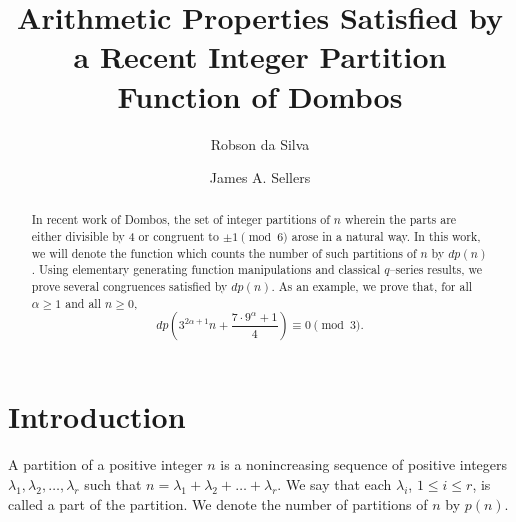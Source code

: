 \documentclass{amsart}
\begin{document}
	
	
	\title[A Partition Function of Dombos]{Arithmetic Properties Satisfied by a Recent Integer Partition Function of Dombos}
	
	
	\author{Robson da Silva}
	\address{Universidade Federal de S\~ao Paulo, S\~ao Jos\'e dos Campos, SP 12247--014, Brazil}

	\author{James A. Sellers}
	\address{Department of Mathematics and Statistics, University of Minnesota Duluth, Duluth, MN 55812, USA}

	
	
	
	

\begin{abstract}
In recent work of Dombos, the set of integer partitions of $n$ wherein the parts are either divisible by 4 or congruent to $\pm 1 \pmod{6}$ arose in a natural way.   In this work, we will denote the function which counts the number of such partitions of $n$ by $dp(n)$.  Using elementary generating function manipulations and classical $q$--series results, we prove several congruences satisfied by $dp(n)$.  As an example, we prove that, for all $\alpha \geq 1$ and all $n \geq  0$,
\begin{equation*}
    dp \left( 3^{2\alpha + 1}n + \frac{7 \cdot 9^\alpha + 1}{4} \right) \equiv 0 \pmod{3}.
\end{equation*} 


\end{abstract}

	\maketitle
	
	


\section{Introduction} 

A partition of a positive integer $n$ is a nonincreasing sequence of positive integers $\lambda_1, \lambda_2, \dots, \lambda_r$ such that $n=\lambda_1+ \lambda_2+ \dots+ \lambda_r$.  We say that each $\lambda_i$, $1\leq i\leq r$, is called a part of the partition.  We denote the number of partitions of $n$ by $p(n)$.  
\end{document}
